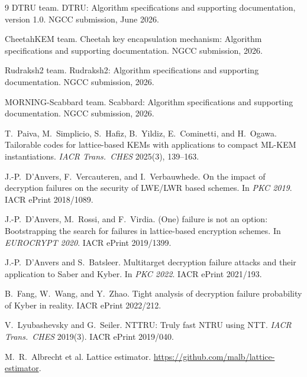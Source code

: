 \documentclass[11pt,a4paper]{article}
\theoremstyle{definition}
\theoremstyle{remark}
\begin{document}
\begin{thebibliography}{9}
DTRU team.
\newblock DTRU: Algorithm specifications and supporting documentation,
version 1.0.
\newblock NGCC submission, June 2026.

CheetahKEM team.
\newblock Cheetah key encapsulation mechanism: Algorithm specifications and
supporting documentation.
\newblock NGCC submission, 2026.

Rudraksh2 team.
\newblock Rudraksh2: Algorithm specifications and supporting documentation.
\newblock NGCC submission, 2026.

MORNING-Scabbard team.
\newblock Scabbard: Algorithm specifications and supporting documentation.
\newblock NGCC submission, 2026.

T.\ Paiva, M.\ Simplicio, S.\ Hafiz, B.\ Yildiz, E.\ Cominetti, and
H.\ Ogawa.
\newblock Tailorable codes for lattice-based KEMs with applications to
compact ML-KEM instantiations.
\newblock \emph{IACR Trans.\ CHES} 2025(3), 139--163.

J.-P.\ D'Anvers, F.\ Vercauteren, and I.\ Verbauwhede.
\newblock On the impact of decryption failures on the security of LWE/LWR
based schemes.
\newblock In \emph{PKC 2019}. IACR ePrint 2018/1089.

J.-P.\ D'Anvers, M.\ Rossi, and F.\ Virdia.
\newblock (One) failure is not an option: Bootstrapping the search for
failures in lattice-based encryption schemes.
\newblock In \emph{EUROCRYPT 2020}. IACR ePrint 2019/1399.

J.-P.\ D'Anvers and S.\ Batsleer.
\newblock Multitarget decryption failure attacks and their application to
Saber and Kyber.
\newblock In \emph{PKC 2022}. IACR ePrint 2021/193.

B.\ Fang, W.\ Wang, and Y.\ Zhao.
\newblock Tight analysis of decryption failure probability of Kyber in
reality.
\newblock IACR ePrint 2022/212.

V.\ Lyubashevsky and G.\ Seiler.
\newblock NTTRU: Truly fast NTRU using NTT.
\newblock \emph{IACR Trans.\ CHES} 2019(3). IACR ePrint 2019/040.

M.\ R.\ Albrecht et al.
\newblock Lattice estimator.
\newblock \url{https://github.com/malb/lattice-estimator}.
\end{thebibliography}
\end{document}
